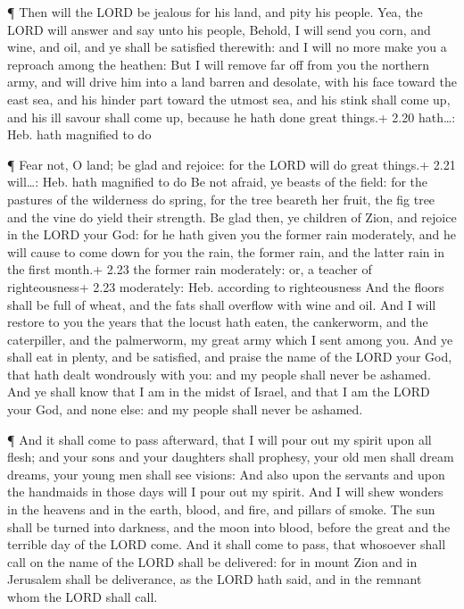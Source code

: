  ¶ Then will the LORD be jealous for his land, and pity his
people.  Yea, the LORD will answer and say unto his people,
Behold, I will send you corn, and wine, and oil, and ye shall be
satisfied therewith: and I will no more make you a reproach among the
heathen:  But I will remove far off from you the northern
army, and will drive him into a land barren and desolate, with his face
toward the east sea, and his hinder part toward the utmost sea, and his
stink shall come up, and his ill savour shall come up, because he hath
done great things.+ 2.20 hath\ldots: Heb. hath magnified to do

 ¶ Fear not, O land; be glad and rejoice: for the LORD will
do great things.+ 2.21 will\ldots: Heb. hath magnified to do
 Be not afraid, ye beasts of the field: for the pastures of
the wilderness do spring, for the tree beareth her fruit, the fig tree
and the vine do yield their strength.  Be glad then, ye
children of Zion, and rejoice in the LORD your God: for he hath given
you the former rain moderately, and he will cause to come down for you
the rain, the former rain, and the latter rain in the first month.+ 2.23
the former rain moderately: or, a teacher of righteousness+ 2.23
moderately: Heb. according to righteousness  And the floors
shall be full of wheat, and the fats shall overflow with wine and oil.
 And I will restore to you the years that the locust hath
eaten, the cankerworm, and the caterpiller, and the palmerworm, my great
army which I sent among you.  And ye shall eat in plenty,
and be satisfied, and praise the name of the LORD your God, that hath
dealt wondrously with you: and my people shall never be ashamed.
 And ye shall know that I am in the midst of Israel, and
that I am the LORD your God, and none else: and my people shall never be
ashamed.

 ¶ And it shall come to pass afterward, that I will pour
out my spirit upon all flesh; and your sons and your daughters shall
prophesy, your old men shall dream dreams, your young men shall see
visions:  And also upon the servants and upon the handmaids
in those days will I pour out my spirit.  And I will shew
wonders in the heavens and in the earth, blood, and fire, and pillars of
smoke.  The sun shall be turned into darkness, and the moon
into blood, before the great and the terrible day of the LORD come.
 And it shall come to pass, that whosoever shall call on
the name of the LORD shall be delivered: for in mount Zion and in
Jerusalem shall be deliverance, as the LORD hath said, and in the
remnant whom the LORD shall call.

